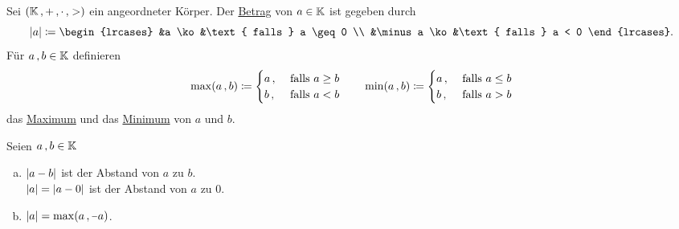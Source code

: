 \documentclass[../ana1.tex]{subfiles}
\begin{document}
\begin{defi}[Betrag]
	Sei \((\mathbb{K} \operatorname{,} + \operatorname{,} \cdot \operatorname{,} >) \) ein angeordneter Körper. Der \underline{Betrag} von 
	\(a \in \mathbb{K} \) ist gegeben durch
	\[\abs{a} \coloneqq
		\begin{lrcases}
			&a \ko  &\text{ falls } a \geq 0  \\
			&\minus a \ko &\text{ falls } a < 0
		\end{lrcases}. \]
	Für \(a \operatorname{,} b \in \mathbb{K} \) definieren
	\[\max(a \operatorname{,} b) \coloneqq
		\begin{cases}
			a \operatorname{,} &\text{ falls } a \geq b  \\
			b \operatorname{,} &\text{ falls } a < b
		\end{cases}
		\qquad
	  \min(a \operatorname{,} b) \coloneqq
		\begin{cases}
			a \operatorname{,} &\text{ falls } a \leq b  \\
			b \operatorname{,} &\text{ falls } a > b
		\end{cases} \]
	das \underline{Maximum} und das \underline{Minimum} von \(a \) und \(b \).
\end{defi}

\begin{bem}\label{bem:abstand}
	Seien \(a \operatorname{,} b \in \mathbb{K} \)
	\begin{enumerate}[(a)]
		\item \(\left|a - b\right| \) ist der Abstand von \(a \) zu \(b \). \\
		      \(\left|a\right| = \left|a - 0\right| \) ist der Abstand von \(a \) zu \(0 \).
		\item \(\abs{a} = \max(a \ko \minus a) \).
	\end{enumerate}
\end{bem}

\iftoggle{short}{}{\newpage}%
\end{document}
